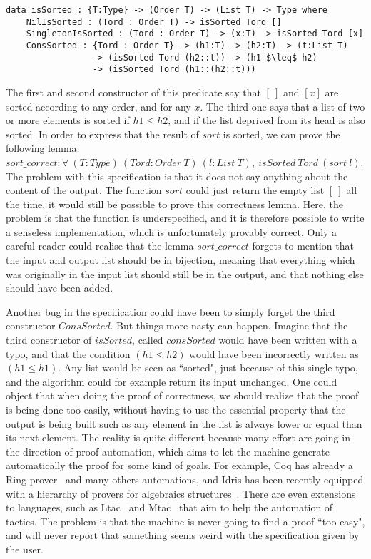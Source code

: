 \begin{lstlisting}
data isSorted : {T:Type} -> (Order T) -> (List T) -> Type where
    NilIsSorted : (Tord : Order T) -> isSorted Tord []
    SingletonIsSorted : (Tord : Order T) -> (x:T) -> isSorted Tord [x]
    ConsSorted : {Tord : Order T} -> (h1:T) -> (h2:T) -> (t:List T) 
                 -> (isSorted Tord (h2::t)) -> (h1 $\leq$ h2) 
                 -> (isSorted Tord (h1::(h2::t)))
\end{lstlisting}
The first and second constructor of this predicate say that $[\ ]$ and $[x]$ are sorted according to any order, and for any $x$. The third one says that a list of two or more elements is sorted if $h1 \le h2$, and if the list deprived from its head is also sorted. In order to express that the result of $sort$ is sorted, we can prove the following lemma:
$sort\_correct : \forall\ (T:Type)\ (Tord:Order\ T)\ (l:List\ T),\ isSorted\ Tord\ (sort\ l)$. The problem with this specification is that it does not say anything about the content of the output. The function $sort$ could just return the empty list $[\ ]$ all the time, it would still be possible to prove this correctness lemma. Here, the problem is that the function is underspecified, and it is therefore possible to write a senseless implementation, which is unfortunately provably correct. Only a careful reader could realise that the lemma $sort\_correct$ forgets to mention that the input and output list should be in bijection, meaning that everything which was originally in the input list should still be in the output, and that nothing else should have been added.

Another bug in the specification could have been to simply forget the third constructor $ConsSorted$. But things more nasty can happen. Imagine that the third constructor of $isSorted$, called $consSorted$ would have been written with a typo, and that the condition $(h1 \leq h2) $ would have been incorrectly written as $(h1 \leq h1)$. Any list would be seen as ``sorted", just because of this single typo, and the algorithm could for example return its input unchanged. One could object that when doing the proof of correctness, we should realize that the proof is being done too easily, without having to use the essential property that the output is being built such as any element in the list is always lower or equal than its next element. The reality is quite different because many effort are going in the direction of proof automation, which aims to let the machine generate automatically the proof for some kind of goals. For example, Coq has already a Ring prover~\cite{coq2005} and many others automations, and Idris has been recently equipped with a hierarchy of provers for algebraics structures~\cite{Slama2016}. There are even extensions to languages, such as Ltac~\cite{DelahayeLTac} and Mtac~\cite{Ziliani13} that aim to help the automation of tactics. The problem is that the machine is never going to find a proof ``too easy", and will never report that something seems weird with the specification given by the user.

